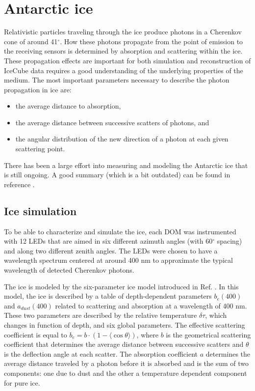 \section{Antarctic ice}
\label{sec:ice}
Relativistic particles traveling through the ice produce photons in a Cherenkov cone of around 41$^\circ$. How these photons propagate from the point of emission to the receiving sensors is determined by absorption and scattering within the ice. These propagation effects are important for both simulation and reconstruction of IceCube data requires a good understanding of the underlying properties of the medium. The most important parameters necessary to describe the photon propagation in ice are: 
\begin{itemize}
\item the average distance to absorption,
\item the average distance between successive scatters of photons, and 
\item the angular distribution of the new direction of a photon at each given scattering point.
\end{itemize}
\vspace{2mm}
There has been a large effort into measuring and modeling the Antarctic ice that is still ongoing. A good summary (which is a bit outdated) can be found in reference \cite{Aartsen:2013rt}.
\subsection{Ice simulation}
\label{subsec:icesimulation}
To be able to characterize and simulate the ice, each DOM was instrumented with 12 LEDs that are aimed in six different azimuth angles (with 60$^\circ$ spacing) and along two different zenith angles. The LEDs were chosen to have a wavelength spectrum centered at around 400 nm to approximate the typical wavelength of detected Cherenkov photons.

The ice is modeled by the six-parameter ice model introduced in Ref. \cite{Ackermann:2006pva}. In this model, the ice is described by a table of depth-dependent parameters $b_e(400)$ and $a_{dust}(400)$ related to scattering and absorption at a wavelength of 400 nm. These two parameters are described by the relative temperature $\delta \tau$, which changes in function of depth, and six global parameters. The effective scattering coefficient is equal to $b_e = b \cdot \left( 1-\langle \cos \theta \rangle \right)$, where $b$ is the geometrical scattering coefficient that determines the average distance between successive scatters and $\theta$ is the deflection angle at each scatter. The absorption coefficient $a$ determines the average distance traveled by a photon before it is absorbed and is the sum of two components: one due to dust and the other a temperature dependent component for pure ice.

